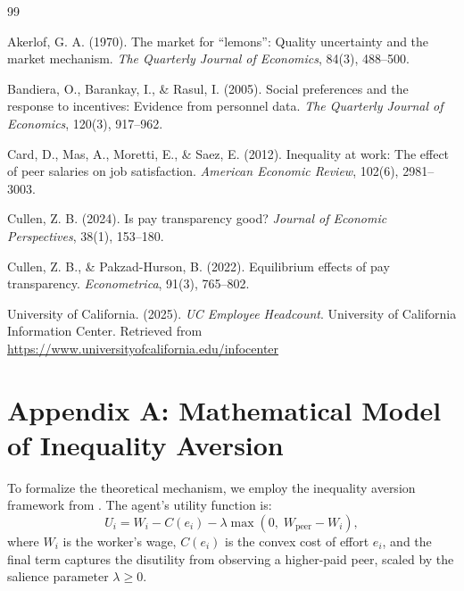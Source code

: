 \documentclass[12pt]{article}
\begin{document}
\newpage

\begin{thebibliography}{99}

Akerlof, G. A. (1970).
\newblock The market for ``lemons'': Quality uncertainty and the market
mechanism.
\newblock \textit{The Quarterly Journal of Economics}, 84(3), 488--500.

Bandiera, O., Barankay, I., \& Rasul, I. (2005).
\newblock Social preferences and the response to incentives: Evidence from
personnel data.
\newblock \textit{The Quarterly Journal of Economics}, 120(3), 917--962.

Card, D., Mas, A., Moretti, E., \& Saez, E. (2012).
\newblock Inequality at work: The effect of peer salaries on job satisfaction.
\newblock \textit{American Economic Review}, 102(6), 2981--3003.

Cullen, Z. B. (2024).
\newblock Is pay transparency good?
\newblock \textit{Journal of Economic Perspectives}, 38(1), 153--180.

Cullen, Z. B., \& Pakzad-Hurson, B. (2022).
\newblock Equilibrium effects of pay transparency.
\newblock \textit{Econometrica}, 91(3), 765--802.

University of California. (2025).
\newblock \textit{UC Employee Headcount}.
\newblock University of California Information Center.
\newblock Retrieved from \url{https://www.universityofcalifornia.edu/infocenter}

\end{thebibliography}

\newpage
\appendix

\section*{Appendix A: Mathematical Model of Inequality Aversion}
\label{app:model}

To formalize the theoretical mechanism, we employ the inequality aversion
framework from \citet{bandiera2005}. The agent's utility function is:
\begin{equation}
  U_i = W_i - C(e_i) - \lambda\max(0,\; W_{\text{peer}} - W_i),
  \label{eq:util_app}
\end{equation}
where $W_i$ is the worker's wage, $C(e_i)$ is the convex cost of effort
$e_i$, and the final term captures the disutility from observing a
higher-paid peer, scaled by the salience parameter $\lambda \geq 0$.
\end{document}
